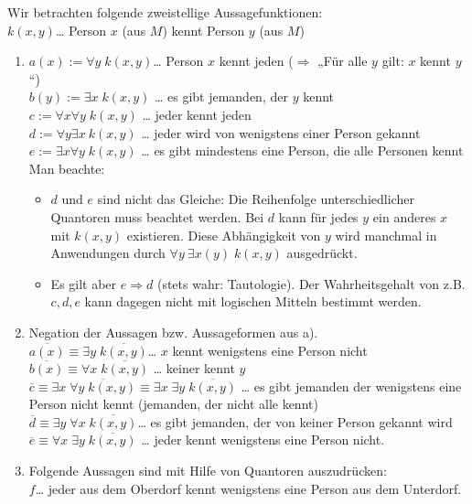 Wir betrachten folgende zweistellige Aussagefunktionen:\\
$k(x,y)$… Person $x$ (aus $M$) kennt Person $y$ (aus $M$)
\begin{enumerate} [label=\alph*)]
\item $a(x):= \forall y \; k(x,y)$… Person $x$ kennt jeden ($\Rightarrow$ „Für alle $y$ gilt: $x$ kennt $y$“)\\
$b(y):= \exists x \; k(x,y)$ … es gibt jemanden, der $y$ kennt\\
$c := \forall x \forall y \; k(x,y)$ … jeder kennt jeden\\
$d := \forall y \exists x \: k(x,y)$ … jeder wird von wenigstens einer Person gekannt\\
$e := \exists x \forall y \; k(x,y)$ … es gibt mindestens eine Person, die alle Personen kennt\\
Man beachte: \begin{itemize}
\item $d$ und $e$ sind nicht das Gleiche: Die Reihenfolge unterschiedlicher Quantoren muss beachtet werden. Bei $d$ kann für jedes $y$ ein anderes $x$ mit $k(x,y)$ existieren. Diese Abhängigkeit von $y$ wird manchmal in Anwendungen durch $\forall y \: \exists x(y) \; k(x,y)$ ausgedrückt.
\item Es gilt aber $e \Rightarrow d$ (stets wahr: Tautologie). Der Wahrheitsgehalt von z.B. $c, d, e$ kann dagegen nicht mit logischen Mitteln bestimmt werden.
\end{itemize}
\item Negation der Aussagen  bzw. Aussageformen aus a).\\
$\overline{a(x)}\equiv \exists y \; \overline{k(x,y)}$… $x$ kennt wenigstens eine Person nicht\\
$\overline{b(x)} \equiv \forall x \; \overline{k(x,y)}$ … keiner kennt $y$\\
$\overline{c} \equiv \exists x \; \overline{\forall y \; k(x,y)}\equiv \exists x \; \exists y \; \overline{k(x,y)}$ … es gibt jemanden der wenigstens eine Person nicht kennt (jemanden, der nicht alle kennt)\\
$\overline{d} \equiv \exists y \; \forall x \; \overline{k(x,y)}$… es gibt jemanden, der von keiner Person gekannt wird
$\overline{e}\equiv \forall x \; \exists y \; \overline{k(x,y)}$ … jeder kennt wenigstens eine Person nicht.
\item Folgende Aussagen sind mit Hilfe von Quantoren auszudrücken:\\
$f$… jeder aus dem Oberdorf kennt wenigstens eine Person aus dem Unterdorf.\\

\end{enumerate}
